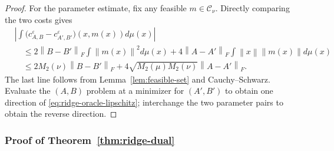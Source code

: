\documentclass[11pt]{article}
\newcommand{\norm}[1]{\left\lVert #1\right\rVert}
\theoremstyle{plain}
\theoremstyle{definition}
\theoremstyle{remark}
\begin{document}
\begin{proof}
For the parameter estimate, fix any feasible $m\in\mathcal C_\nu$.  Directly
comparing the two costs gives
\begin{align*}
 &\left|\int
   \bigl(c_{A,B}^\varepsilon-c_{A',B'}^\varepsilon\bigr)(x,m(x))
   d\mu(x)\right|\\
 &\quad\le
 2\norm{B-B'}_F\int\norm{m(x)}^2d\mu(x)
 +4\norm{A-A'}_F\int\norm{x}\norm{m(x)}d\mu(x)\\
 &\quad\le
 2M_2(\nu)\norm{B-B'}_F
 +4\sqrt{M_2(\mu)M_2(\nu)}\norm{A-A'}_F.
\end{align*}
The last line follows from Lemma~\ref{lem:feasible-set} and
Cauchy--Schwarz.  Evaluate the $(A,B)$ problem at a minimizer for $(A',B')$
to obtain one direction of \eqref{eq:ridge-oracle-lipschitz}; interchange the
two parameter pairs to obtain the reverse direction.
\end{proof}

\subsubsection{Proof of Theorem~\ref{thm:ridge-dual}}\label{proof:8.3}
\end{document}
